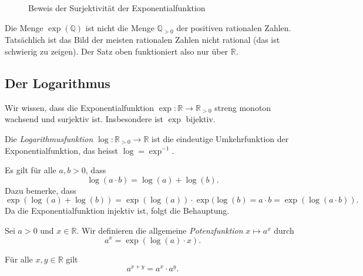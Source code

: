 \documentclass[../main.tex]{subfiles}
\begin{document}
\begin{figure}[htb]
  \centering
  
  \caption{Beweis der Surjektivität der Exponentialfunktion}%
  \label{fig:exp}
\end{figure}


\begin{remark}
  Die Menge $\exp(\mathbb{Q})$ ist nicht die Menge
  $\mathbb{Q}_{>0}$ der positiven rationalen Zahlen.
  Tatsächlich ist das Bild der meisten rationalen Zahlen
  nicht rational (das ist schwierig zu zeigen).
  Der Satz oben funktioniert also nur über $\mathbb{R}$.
\end{remark}

\subsection*{Der Logarithmus}
Wir wissen, dass die Exponentialfunktion
$
  \exp \colon \mathbb{R} \to \mathbb{R}_{>0}
  $
streng monoton wachsend und surjektiv ist.
Insbesondere ist $\exp$ bijektiv.

\begin{definition}
  Die \emph{Logarithmusfunktion}
  $\log \colon \mathbb{R}_{>0} \to \mathbb{R}$ ist die
  eindeutige Umkehrfunktion der Exponentialfunktion,
  das heisst $\log = \exp^{-1}$.
\end{definition}

\begin{remark}
Es gilt für alle $a, b > 0$, dass
\[
  \log(a \cdot b) = \log(a) + \log(b).
\]
Dazu bemerke, dass
\[
  \exp(\log(a) + \log(b)) = 
  \exp(\log(a)) \cdot \exp(\log(b) 
  = a \cdot b = \exp(\log(a \cdot b)).
\]
Da die Exponentialfunktion injektiv ist,
folgt die Behauptung.
\end{remark}

\begin{definition}
  Sei $a > 0$ und $x \in \mathbb{R}$. Wir definieren
  die allgemeine \emph{Potenzfunktion}
  $x \mapsto a^x$ durch
  \[
    a^x = \exp(\log(a) \cdot x).
  \]
\end{definition}

\begin{remark}
  Für alle $x, y \in \mathbb{R}$ gilt
  \[
    a^{x+y} = a^{x} \cdot a^{y}.
  \]
\end{remark}
\end{document}
